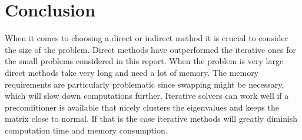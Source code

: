 \section{Conclusion}
When it comes to choosing a direct or indirect method it is crucial to consider the size of the problem. Direct methods have outperformed the iterative ones for the small problems considered in this report. When the problem is very large direct methods take very long and need a lot of memory. The memory requirements are particularly problematic since swapping might be necessary, which will slow down computations further. Iterative solvers can work well if a preconditioner is available that nicely clusters the eigenvalues and keeps the matrix close to normal. If that is the case iterative methods will greatly diminish computation time and memory consumption. 

